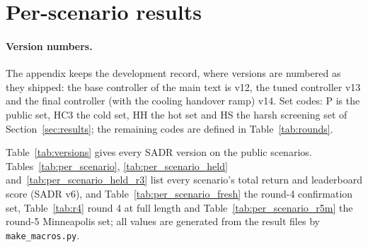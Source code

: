 \documentclass{article}
\begin{document}
\section{Per-scenario results}
\label{app:per_scenario}
\paragraph{Version numbers.} The appendix keeps the development record, where versions are numbered as they shipped: the base controller of the main text is v12, the tuned controller v13 and the final controller (with the cooling handover ramp) v14. Set codes: P is the public set, HC3 the cold set, HH the hot set and HS the harsh screening set of Section~\ref{sec:results}; the remaining codes are defined in Table~\ref{tab:rounds}.


Table~\ref{tab:versions} gives every SADR version on the public scenarios. Tables~\ref{tab:per_scenario}, \ref{tab:per_scenario_held} and~\ref{tab:per_scenario_held_r3}
list every scenario's total return and leaderboard score (SADR v6), and
Table~\ref{tab:per_scenario_fresh} the round-4 confirmation set, Table~\ref{tab:r4} round 4 at full length and
Table~\ref{tab:per_scenario_r5m} the round-5 Minneapolis set; all values are generated from the
result files by \texttt{make\_macros.py}.
\end{document}
